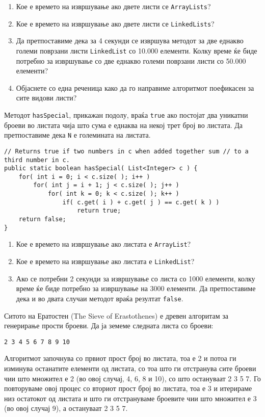 \begin{questions}
\begin{lstlisting}
\end{lstlisting}
\begin{enumerate}
  \item Кое е времето на извршување ако двете листи се \texttt{ArrayLists}?
  \item Кое е времето на извршување ако двете листи се \texttt{LinkedLists}?
  \item Да претпоставиме дека за 4 секунди се извршува методот за две еднакво
  големи поврзани листи \texttt{LinkedList} со 10.000 елементи. Колку време ќе
  биде потребно за извршување со две еднакво големи поврзани листи со 50.000
  елементи?
  \item Објаснете со една реченица како да го направиме алгоритмот поефикасен за
  сите видови листи?
\end{enumerate}

\question

Методот \texttt{hasSpecial}, прикажан подолу, враќа \texttt{true} ако постојат
два уникатни броеви во листата чија што сума е еднаква на некој трет број во
листата. Да претпоставиме дека \texttt{N} е големината на листата. 

\begin{lstlisting}
// Returns true if two numbers in c when added together sum // to a third number in c.
public static boolean hasSpecial( List<Integer> c ) {
    for( int i = 0; i < c.size( ); i++ )
        for( int j = i + 1; j < c.size( ); j++ )
            for( int k = 0; k < c.size( ); k++ )
                if( c.get( i ) + c.get( j ) == c.get( k ) )
                    return true;
    return false;
}
\end{lstlisting}
\begin{enumerate}
  \item Кое е времето на извршување ако листата е \texttt{ArrayList}?
  \item Кое е времето на извршување ако листата е \texttt{LinkedList}?
  \item Ако се потребни 2 секунди за извршување со листа со 1000 елементи, колку
  време ќе биде потребно за извршување на 3000 елементи. Да претпоставиме дека и
  во двата случаи методот враќа резултат \texttt{false}.
\end{enumerate}

\question
Ситото на Ератостен (The Sieve of Erastothenes) е  древен алгоритам за
генерирање прости броеви. Да ја земеме следната листа со броеви:
\begin{verbatim}
2 3 4 5 6 7 8 9 10
\end{verbatim}
Алгоритмот започнува со првиот прост број во листата, тоа е 2 и потоа ги
изминува останатите елементи од листата, со тоа што ги отстранува сите броеви
чии што множител е 2 (во овој случај, 4, 6, 8 и 10), со што остануваат 2 3 5 7.
Го повторуваме овој процес со вториот прост број во листата, тоа е 3 и итерираме
низ остатокот од листата и што ги отстрануваме броевите чии што множител е 3
(во овој случај 9), а остануваат 2 3 5 7.


\end{questions}
